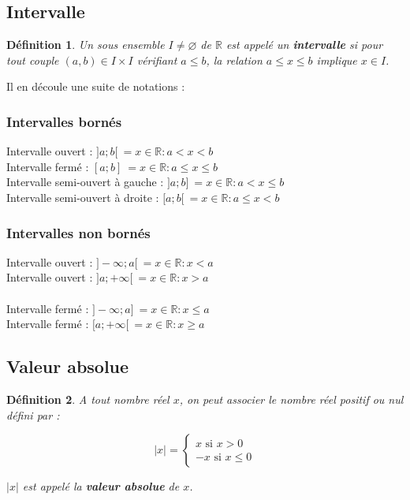 \documentclass[12pt, a4paper]{book}
\newtheorem*{definition}{Définition}
\let\emptyset\varnothing
\begin{document}
\subsection{Intervalle}
\begin{definition}
    Un sous ensemble $I \not = \emptyset$ de $\mathbb{R}$ est appelé un
    \textbf{intervalle} si pour tout couple $(a,b) \in I \times I$ vérifiant
     $a \leq b$, la relation $a \leq x \leq b$ implique $x \in I $.
\end{definition}
Il en découle une suite de notations :
\newpage
\subsubsection{Intervalles bornés}
Intervalle ouvert : $]a;b[ \ = ${$x \in \mathbb{R}:a < x < b$}\\
Intervalle fermé : $[a;b]\ = ${$x \in \mathbb{R}:a \leq x \leq b$}\\
Intervalle semi-ouvert à gauche : $]a;b]\ = ${$x \in \mathbb{R}:a < x \leq b$}\\
Intervalle semi-ouvert à droite : $[a;b[ \ = ${$x \in \mathbb{R}:a \leq x < b$}\\
\subsubsection{Intervalles non bornés}
Intervalle ouvert : $]-\infty;a[ \ = ${$x \in \mathbb{R}:x<a$}\\
Intervalle ouvert : $]a ;+\infty[\ = ${$x \in \mathbb{R}:x>a$}\\
\newline \\
Intervalle fermé : $]-\infty;a] \ = ${$x \in \mathbb{R}:x\leq a$}\\
Intervalle fermé :  $[a ;+\infty[ \ = ${$x \in \mathbb{R}:x \geq a$}\\

\subsection{Valeur absolue}
\begin{definition}
    A tout nombre réel $x$, on peut associer le nombre réel positif ou nul défini par :
    \begin{center}
        $$\lvert x \rvert =
        \begin{cases}
            x \text{ si } x > 0\\
            -x \text{ si } x \leq 0
        \end{cases}
        $$
    \end{center}
$\lvert x \rvert$ est appelé la \textbf{valeur absolue} de $x$.
\end{definition}
\end{document}
